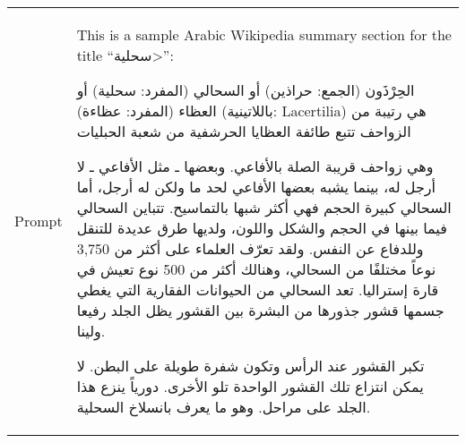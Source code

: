 \begin{center}
\begin{supertabular}{l | p{12cm}}
        
        \midrule
        Prompt & 
        This is a sample Arabic Wikipedia summary section for the title ``\<سحلية>'':
        
        {\small \begin{RLtext}
        
        الحِرْذَون (الجمع: حراذين) أو السحالي (المفرد: سحلية) أو العظاء (المفرد: عظاءة) (باللاتينية: Lacertilia) هي رتيبة من الزواحف تتبع طائفة العظايا الحرشفية من شعبة الحبليات
        
        وهي زواحف قريبة الصلة بالأفاعي. وبعضها ـ مثل الأفاعي ـ لا أرجل له، بينما يشبه بعضها الأفاعي لحد ما ولكن له أرجل، أما السحالي كبيرة الحجم فهي أكثر شبها بالتماسيح. تتباين السحالي فيما بينها في الحجم والشكل واللون، ولديها طرق عديدة للتنقل وللدفاع عن النفس. ولقد تعرّف العلماء على أكثر من 3,750 نوعاً مختلفًا من السحالي، وهنالك أكثر من 500 نوع تعيش في قارة إستراليا. تعد السحالي من الحيوانات الفقارية التي يغطي جسمها قشور جذورها من البشرة بين القشور يظل الجلد رفيعا ولينا.
        
        تكبر القشور عند الرأس وتكون شفرة طويلة على البطن. لا يمكن انتزاع تلك القشور الواحدة تلو الأخرى. دورياً ينزع هذا الجلد على مراحل. وهو ما يعرف بانسلاخ السحلية.
        

\end{RLtext}}
\end{supertabular}
\end{center}
